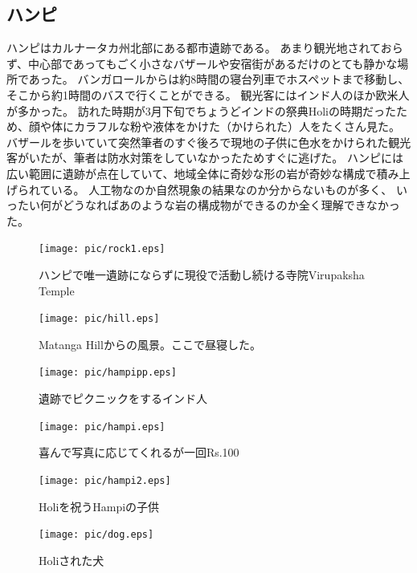 \subsection{ハンピ}
ハンピはカルナータカ州北部にある都市遺跡である。
あまり観光地されておらず、中心部であってもごく小さなバザールや安宿街があるだけのとても静かな場所であった。
バンガロールからは約8時間の寝台列車でホスペットまで移動し、そこから約1時間のバスで行くことができる。
観光客にはインド人のほか欧米人が多かった。
訪れた時期が3月下旬でちょうどインドの祭典Holiの時期だったため、顔や体にカラフルな粉や液体をかけた（かけられた）人をたくさん見た。
バザールを歩いていて突然筆者のすぐ後ろで現地の子供に色水をかけられた観光客がいたが、筆者は防水対策をしていなかったためすぐに逃げた。
ハンピには広い範囲に遺跡が点在していて、地域全体に奇妙な形の岩が奇妙な構成で積み上げられている。
人工物なのか自然現象の結果なのか分からないものが多く、
いったい何がどうなればあのような岩の構成物ができるのか全く理解できなかった。
\begin{figure}[H]
  \begin{minipage}{0.5\hsize}
  \begin{center}
    \texttt{[image: pic/rock1.eps]}
  \end{center}
  \caption{ハンピで唯一遺跡にならずに現役で活動し続ける寺院Virupaksha Temple}
  \end{minipage}
  \begin{minipage}{0.5\hsize}
  \begin{center}
    \texttt{[image: pic/hill.eps]}
  \end{center}
  \caption{Matanga Hillからの風景。ここで昼寝した。}
  \end{minipage}
\end{figure}
\begin{figure}[H]
  \begin{minipage}{0.5\hsize}
  \begin{center}
    \texttt{[image: pic/hampipp.eps]}
  \end{center}
  \caption{遺跡でピクニックをするインド人}
  \end{minipage}
  \begin{minipage}{0.5\hsize}
  \begin{center}
    \texttt{[image: pic/hampi.eps]}
  \end{center}
  \caption{喜んで写真に応じてくれるが一回Rs.100}
  \end{minipage}
\end{figure}
\begin{figure}[H]
  \begin{minipage}{0.5\hsize}
  \begin{center}
    \texttt{[image: pic/hampi2.eps]}
  \end{center}
  \caption{Holiを祝うHampiの子供}
  \end{minipage}
  \begin{minipage}{0.5\hsize}
  \begin{center}
    \texttt{[image: pic/dog.eps]}
  \end{center}
  \caption{Holiされた犬}
  \end{minipage}
\end{figure}
